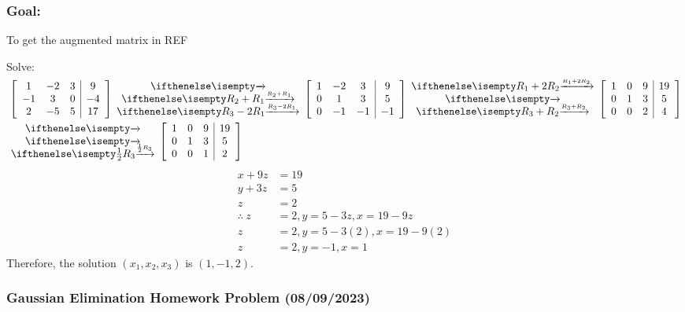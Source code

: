 \documentclass[
  letterpaper,
  DIV=11,
  numbers=noendperiod]{scrartcl}
\begin{document}
\subsubsection{Goal:}\label{goal}

To get the augmented matrix in REF

Solve:
\begin{align*}
&\left[\begin{array}{ccc|c}1 & -2 & 3 & 9 \\ -1 & 3 & 0 & -4 \\ 2 & -5 & 5 & 17 \end{array}\right]\rowops{,R_2+R_1,R_3-2R_1}\left[\begin{array}{ccc|c}1 & -2 & 3 & 9 \\ 0 & 1 & 3 & 5 \\ 0 & -1 & -1 & -1 \end{array}\right]\rowops{R_1+2R_2,,R_3+R_2}\left[\begin{array}{ccc|c}1 & 0 & 9 & 19 \\ 0 & 1 & 3 & 5 \\ 0 & 0 & 2 & 4 \end{array}\right] \\
&\rowops{,,\frac{1}{2}R_3}\left[\begin{array}{ccc|c}1 & 0 & 9 & 19 \\ 0 & 1 & 3 & 5 \\ 0 & 0 & 1 & 2\end{array}\right]
\end{align*} \begin{align*}
x + 9z &= 19 \\
y + 3z &= 5 \\
z &= 2 \\
\therefore \ z &= 2, y = 5-3z, x = 19-9z \\
z &= 2, y = 5-3(2), x = 19-9(2) \\
z &= 2, y = -1, x = 1
\end{align*} Therefore, the solution \((x_1, x_2, x_3)\) is
\((1, -1, 2)\).

\subsubsection{Gaussian Elimination Homework Problem
(08/09/2023)}\label{gaussian-elimination-homework-problem-08092023}

\end{document}
